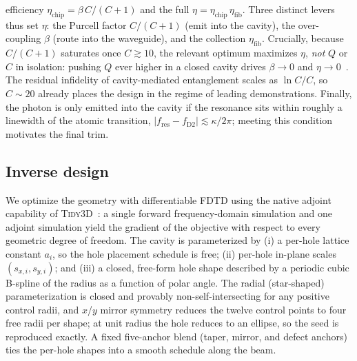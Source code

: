 \documentclass[%
 reprint,
 amsmath,amssymb,
 aps,prx,
 superscriptaddress,
]{revtex4-2}
\begin{document}
efficiency $\eta_\mathrm{chip}=\beta\,C/(C{+}1)$ and the full
$\eta=\eta_\mathrm{chip}\,\eta_\mathrm{fib}$. Three
distinct levers thus set $\eta$: the Purcell factor $C/(C{+}1)$ (emit into the
cavity), the over-coupling $\beta$ (route into the waveguide), and the collection
$\eta_\mathrm{fib}$. Crucially, because $C/(C{+}1)$ saturates once $C\gtrsim10$,
the relevant optimum maximizes $\eta$, \emph{not} $Q$ or $C$ in isolation: pushing
$Q$ ever higher in a closed cavity drives $\beta\to0$ and
$\eta\to0$~\cite{knall2022}. The residual
infidelity of cavity-mediated entanglement scales as $\ln C/C$, so $C\sim20$
already places the design in the regime of leading demonstrations. Finally, the
photon is only emitted into the cavity if the resonance sits within roughly a
linewidth of the atomic transition, $|f_\mathrm{res}-f_\mathrm{D2}|\lesssim
\kappa/2\pi$; meeting this condition motivates the final trim.

\subsection{Inverse design}

We optimize the geometry with differentiable FDTD using the native adjoint
capability of \textsc{Tidy3D}~\cite{tidy3d,molesky2018}: a single forward
frequency-domain simulation and one adjoint simulation yield the gradient of the
objective with respect to every geometric degree of freedom. The cavity is
parameterized by (i) a per-hole lattice constant $a_i$, so the hole placement
schedule is free; (ii) per-hole in-plane scales $(s_{x,i},s_{y,i})$; and (iii) a
closed, free-form hole shape described by a periodic cubic B-spline of the radius
as a function of polar angle. The radial (star-shaped) parameterization is closed
and provably non-self-intersecting for any positive control radii, and $x$/$y$
mirror symmetry reduces the twelve control points to four free radii per shape;
at unit radius the hole reduces to an ellipse, so the seed is reproduced exactly.
A fixed five-anchor blend (taper, mirror, and defect anchors) ties the per-hole
shapes into a smooth schedule along the beam.
\end{document}
